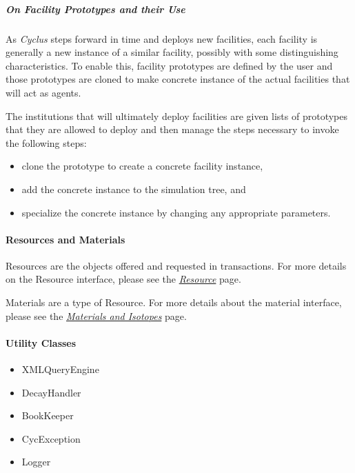 \documentclass[letterpaper,10pt,english]{sphinxmanual}
\begin{document}
\subparagraph{On Facility Prototypes and their Use}
\label{devdoc/cyclus_env:on-facility-prototypes-and-their-use}
As \emph{Cyclus} steps forward in time and deploys new facilities, each
facility is generally a new instance of a similar facility, possibly
with some distinguishing characteristics.  To enable this, facility
prototypes are defined by the user and those prototypes are cloned to
make concrete instance of the actual facilities that will act as
agents.

The institutions that will ultimately deploy facilities are given
lists of prototypes that they are allowed to deploy and then manage the
steps necessary to invoke the following steps:
\begin{itemize}
\item {} 
clone the prototype to create a concrete facility instance,

\item {} 
add the concrete instance to the simulation tree, and

\item {} 
specialize the concrete instance by changing any appropriate parameters.

\end{itemize}


\paragraph{Resources and Materials}
\label{devdoc/cyclus_env:resources-and-materials}
Resources are the objects offered and requested in transactions. For more
details on the Resource interface, please see the {\hyperref[devdoc/resources::doc]{\emph{Resource}}}
page.

Materials are a type of Resource. For more details about the material
interface, please see the
{\hyperref[devdoc/materials_and_isotopes::doc]{\emph{Materials and Isotopes}}} page.


\paragraph{Utility Classes}
\label{devdoc/cyclus_env:utility-classes}\begin{itemize}
\item {} 
XMLQueryEngine

\item {} 
DecayHandler

\item {} 
BookKeeper

\item {} 
CycException

\item {} 
Logger

\end{itemize}
\end{document}
